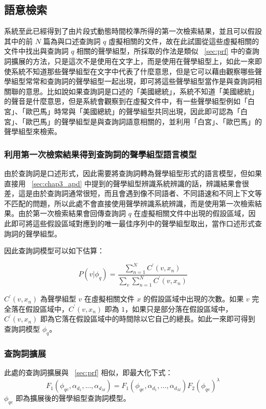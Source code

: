 \subsection{語意檢索}
系統至此已經得到了由片段式動態時間校準所得的第一次檢索結果，並且可以假設其中的前 $N$ 篇為與口述查詢詞 $q$ 虛擬相關的文件，故在此試圖從這些虛擬相關的文件中找出與查詢詞 $q$ 相關的聲學組型，所採取的作法是類似 ~\ref{sec:prf}
中的查詢詞擴展的方法，只是這次不是使用在文字上，而是使用在聲學組型上，如此一來即使系統不知道那些聲學組型在文字中代表了什麼意思，但是它可以藉由觀察哪些聲學組型常常和查詢詞的聲學組型一起出現，即可將這些聲學組型當作是與查詢詞相關聯的意思。比如說如果查詢詞是口述的「美國總統」，系統不知道「美國總統」的聲音是什麼意思，但是系統會觀察到在虛擬文件中，有一些聲學組型例如「白宮」、「歐巴馬」時常與「美國總統」的聲學組型共同出現，因此即可認為「白宮」、「歐巴馬」的聲學組型是與查詢詞語意相關的，並利用「白宮」、「歐巴馬」的聲學組型來檢索。

\subsubsection{利用第一次檢索結果得到查詢詞的聲學組型語言模型}
\label{sec:chap4_decode_query}
由於查詢詞是口述形式，因此需要將查詢詞轉為聲學組型形式的語言模型，但如果直接用 ~\ref{sec:chap3_apd} 中提到的聲學組型辨識系統辨識的話，辨識結果會很差，這是由於查詢詞通常很短，而且會遇到像不同語者、不同語速和不同上下文等不匹配的問題，所以此處不會直接使用聲學辨識系統辨識，而是使用第一次檢索結果。由於第一次檢索結果會回傳查詢詞 $q$ 在虛擬相關文件中出現的假設區域，因此即可將這些假設區域對應到的唯一最佳序列中的聲學組型取出，當作口述形式查詢詞的聲學組型。

因此查詢詞模型可以如下估算：

\begin{equation}
P(v|\phi_q) = \frac{\sum_{n=1}^{N} C^{'}(v, x_n)}{\sum_v \sum_{n=1}^{N} C^{'}(v, x_n)}
\end{equation}

$C^{'}(v, x_n)$ 為聲學組型 $v$ 在虛擬相關文件 $x$ 的假設區域中出現的次數。如果 $v$ 完全落在假設區域中，$C^{'}(v, x_n)$ 即為 $1$，如果只是部分落在假設區域中，$C^{'}(v, x_n)$ 即為它落在假設區域中的時間除以它自己的總長。如此一來即可得到查詢詞模型 $\phi_q$。

\subsubsection{查詢詞擴展}
此處的查詢詞擴展與 ~\ref{sec:prf} 相似，即最大化下式：
\begin{equation}
\label{equ:chap4_qe}
F_1(\phi_{qe}, \alpha_{d_1}, ..., \alpha_{d_M}) = F_1(\phi_{qe}, \alpha_{d_1}, ..., \alpha_{d_M}) F_2(\phi_{qe})^\lambda
\end{equation}
$\phi_{qe}$ 即為擴展後的聲學組型查詢詞模型。


